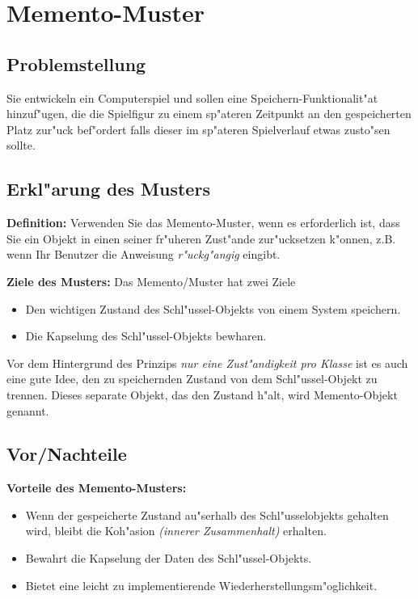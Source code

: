 \section{Memento-Muster}

\subsection{Problemstellung}
Sie entwickeln ein Computerspiel und sollen eine Speichern-Funktionalit"at hinzuf"ugen, die die Spielfigur zu einem sp"ateren Zeitpunkt an den gespeicherten Platz zur"uck bef"ordert falls dieser im sp"ateren Spielverlauf etwas zusto"sen sollte.

\subsection{Erkl"arung des Musters}
\textbf{Definition:} Verwenden Sie das Memento-Muster, wenn es erforderlich ist, dass Sie ein Objekt in einen seiner fr"uheren Zust"ande zur"ucksetzen k"onnen, z.B. wenn Ihr Benutzer die Anweisung \emph{r"uckg"angig} eingibt.

\textbf{Ziele des Musters:} Das Memento/Muster hat zwei Ziele
\begin{itemize}
	\item Den wichtigen Zustand des Schl"ussel-Objekts von einem System speichern.
	\item Die Kapselung des Schl"ussel-Objekts bewharen.
\end{itemize}

Vor dem Hintergrund des Prinzips \emph{nur eine Zust"andigkeit pro Klasse} ist es auch eine gute Idee, den zu speichernden Zustand von dem Schl"ussel-Objekt zu trennen. Dieses separate Objekt, das den Zustand h"alt, wird Memento-Objekt genannt. 

\subsection{Vor/Nachteile}

\textbf{Vorteile des Memento-Musters:}
\begin{itemize}
	\item Wenn der gespeicherte Zustand au"serhalb des Schl"usselobjekts gehalten wird, bleibt die Koh"asion \emph{(innerer Zusammenhalt)} erhalten.
	\item Bewahrt die Kapselung der Daten des Schl"ussel-Objekts.
	\item Bietet eine leicht zu implementierende Wiederherstellungsm"oglichkeit. 
\end{itemize}


